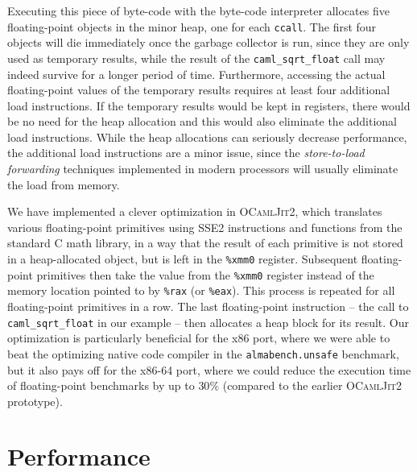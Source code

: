 \documentclass[12pt,a4paper,final]{article}
\begin{document}
Executing this piece of byte-code with the byte-code interpreter allocates five
floating-point objects in the minor heap, one for each \texttt{ccall}. The first
four objects will die immediately once the garbage collector is run, since they
are only used as temporary results, while the result of the \texttt{caml\_sqrt\_float}
call may indeed survive for a longer period of time. Furthermore, accessing the
actual floating-point values of the temporary results requires at least four
additional load instructions.
If the temporary results would be kept in registers, there would be no need for
the heap allocation and this would also eliminate the additional load instructions.
While the heap allocations can seriously decrease performance, the additional
load instructions are a minor issue, since the \emph{store-to-load forwarding}
techniques \cite{Austin95,Lipasti96} implemented in modern processors will usually
eliminate the load from memory.

We have implemented a clever optimization in \textsc{OCamlJit2}, which translates
various floating-point primitives using SSE2 instructions and functions from the
standard C math library, in a way that the result of each primitive is not stored in
a heap-allocated object, but is left in the \texttt{\%xmm0} register. Subsequent
floating-point primitives then take the value from the \texttt{\%xmm0} register
instead of the memory location pointed to by \texttt{\%rax} (or \texttt{\%eax}).
This process is repeated for all floating-point primitives in a row. The last
floating-point instruction -- the call to \texttt{caml\_sqrt\_float} in our
example -- then allocates a heap block for its result.
Our optimization is particularly beneficial for the x86 port, where we were able
to beat the optimizing native code compiler in the \texttt{almabench.unsafe}
benchmark, but it also pays off for the x86-64 port, where we could reduce the
execution time of floating-point benchmarks by up to $30\%$ (compared to the
earlier \textsc{OCamlJit2} prototype).


\section{Performance} \label{section:Performance}
\end{document}

